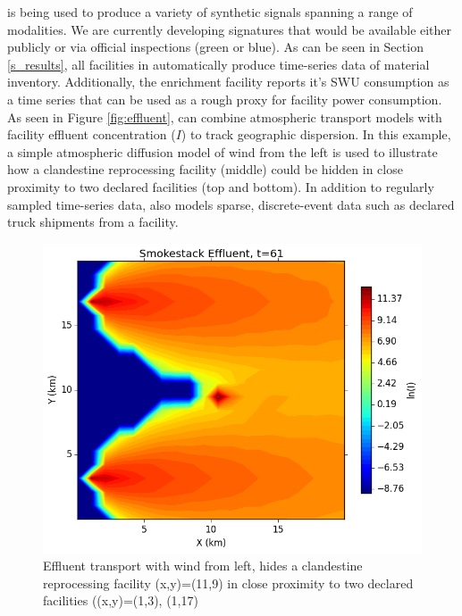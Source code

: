 \Cyclus is being used to produce a variety of synthetic signals spanning a range of modalities.  We are currently developing signatures that would be available either publicly or via official inspections (green or blue).  As can be seen in Section \ref{s_results}, all facilities in \Cyclus automatically produce time-series data of material inventory.  Additionally, the enrichment facility reports it's SWU consumption as a time series that can be used as a rough proxy for facility power consumption. As seen in Figure \ref{fig:effluent}, \Cyclus can combine atmospheric transport models with facility effluent concentration ($I$) to track geographic dispersion. In this example, a simple atmospheric diffusion model of wind from the left is used to illustrate how a clandestine reprocessing facility (middle) could be hidden in close proximity to two declared facilities (top and bottom)\cite{simple_transport_model}.  In addition to regularly sampled time-series data, \Cyclus also models sparse, discrete-event data such as declared truck shipments from a facility.


\begin{figure}%
\begin{center}
\includegraphics[natwidth=162bp,natheight=227bp, scale=0.6]{./figs/proper_diff_fr61.png}
\end{center}
\caption{Effluent transport with wind from left, hides a clandestine reprocessing facility (x,y)=(11,9) in close proximity to two declared facilities ((x,y)=(1,3), (1,17)}
\label{fig:signatures}
\end{figure}

